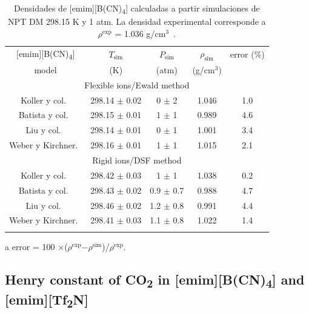 \documentclass[3p,twocolumn]{elsarticle}
\begin{document}
\begin{table}[htp]
\caption{Densidades de [emim][B(CN)\textsubscript{4}] calculadas a partir simulaciones de NPT DM 298.15 K y 1 atm. La densidad experimental corresponde a $\rho^{\text{exp}}$ = 1.036 g/cm$^{3}$~\cite{Doma_ska_2011}.}
\begin{threeparttable}
\begin{tabular}{ c  c  c  c  c}  
\hline \hline
$\text{[emim]}$[B(CN)\textsubscript{4}] & $T_{\text{sim}}$ & $ P_{\text{sim}} $ & $\rho_{\text{sim}}$ & error (\%)\tnote{a} \\
model & (K) &  (atm) &  (g/cm$^{3}$) &  \\
			\hline
		 \multicolumn{5}{c}{Flexible ions/Ewald method}\\

Koller y col.~\cite{Koller_2012}  & 298.14 $\pm$  0.02 & 0 $\pm$ 2 & 1.046 & 1.0 \\
Batista y col.~\cite{Batista_2015} & 298.15 $\pm$ 0.01  & 1 $\pm$ 1 & 0.989 & 4.6  \\
Liu y col.~\cite{Liu_2014}  & 298.14 $\pm$ 0.01 & 0 $\pm$ 1 & 1.001 & 3.4  \\
Weber y Kirchner.~\cite{Weber_2016}  & 298.16  $\pm$ 0.01 & 1 $\pm$ 1 & 1.015 & 2.1  \\
	 \multicolumn{5}{c}{Rigid ions/DSF method}\\
Koller y col.~\cite{Koller_2012}   & 298.42  $\pm$ 0.03  & 1 $\pm$ 1 & 1.038 & 0.2 \\
Batista y col.~\cite{Batista_2015} & 298.43 $\pm$ 0.02  & 0.9 $\pm$ 0.7  & 0.988 & 4.7  \\
Liu y col.~\cite{Liu_2014}  & 298.46 $\pm$ 0.02 & 1.2  $\pm$ 0.8 & 0.991 &  4.4 \\
Weber y Kirchner.~\cite{Weber_2016} &  298.41 $\pm$ 0.03 & 1.1 $\pm$ 0.8 & 1.022 & 1.4  \\
 \hline \hline
\label{table:props_dsf} 
\end{tabular}
\begin{tablenotes}
\item[a] error = 100 $\times$($\rho^{\text{exp}}$$ - $$\rho^{\text{sim}}$)/$\rho^{\text{exp}}$.
\end{tablenotes}
\end{threeparttable}
\end{table}

\subsection{Henry constant of CO\textsubscript{2} in [emim][B(CN)\textsubscript{4}] and [emim][Tf\textsubscript{2}N]}
\label{sec:henry_results}
\end{document}
